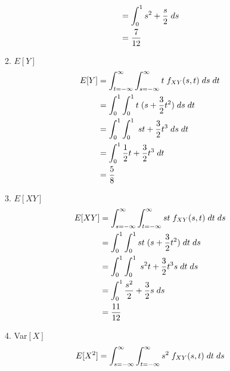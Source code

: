 \documentclass[,oneside]{article}
\begin{document}
\begin{enumerate}
\begin{enumerate}
\begin{align*}
&=\int_{0}^{1} s^2+\frac{s}{2}\hspace{0.1cm}ds\\
&= \frac{7}{12}
\end{align*}
\item $E[Y]$
\begin{align*}
E[Y]&=\int_{t=-\infty}^{\infty} \int_{s=-\infty}^{\infty}t\hspace{0.1cm}f_{XY}(s,t)\hspace{0.1cm}ds\hspace{0.1cm}dt\\
&=\int_{0}^{1} \int_{0}^{1}t\hspace{0.1cm} (s+\frac{3}{2}t^2)\hspace{0.1cm}ds\hspace{0.1cm}dt\\
&=\int_{0}^{1} \int_{0}^{1}\hspace{0.1cm} st+\frac{3}{2}t^3 \hspace{0.1cm}ds\hspace{0.1cm}dt\\
&=\int_{0}^{1} \frac{1}{2}t+\frac{3}{2}t^3\hspace{0.1cm}dt\\
&= \frac{5}{8}
\end{align*}
\item $E[XY]$
\begin{align*}
E[XY]&=\int_{s=-\infty}^{\infty} \int_{t=-\infty}^{\infty}st\hspace{0.1cm}f_{XY}(s,t)\hspace{0.1cm}dt\hspace{0.1cm}ds\\
&=\int_{0}^{1} \int_{0}^{1}st\hspace{0.1cm} (s+\frac{3}{2}t^2)\hspace{0.1cm}dt\hspace{0.1cm}ds\\
&=\int_{0}^{1} \int_{0}^{1}\hspace{0.1cm} s^2 t+\frac{3}{2}t^3 s\hspace{0.1cm}dt\hspace{0.1cm}ds\\
&=\int_{0}^{1} \frac{s^2}{2}+\frac{3}{2}s\hspace{0.1cm}ds\\
&= \frac{11}{12}
\end{align*}
\item Var$[X]$
\begin{align*}
E[X^2]&=\int_{s=-\infty}^{\infty} \int_{t=-\infty}^{\infty}s^2\hspace{0.1cm}f_{XY}(s,t)\hspace{0.1cm}dt\hspace{0.1cm}ds\\

\end{align*}
\end{enumerate}
\end{enumerate}
\end{document}
